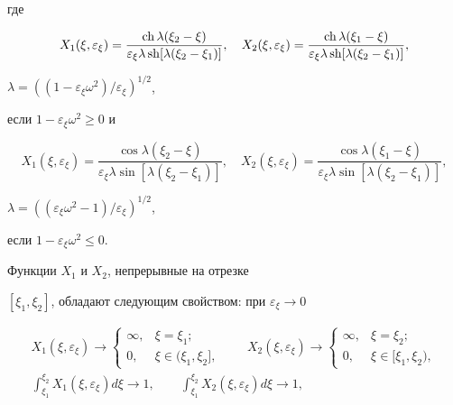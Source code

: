 где


$$


X_{1}(\xi,\varepsilon_{\xi})=\frac{\ch \lambda(\xi_{2}-\xi)}


{\varepsilon_{\xi}\lambda \sh[\lambda(\xi_{2}-\xi_{1})]},\quad


X_{2}(\xi,\varepsilon_{\xi})=\frac{\ch \lambda(\xi_{1}-\xi)}


{\varepsilon_{\xi}\lambda \sh[\lambda(\xi_{2}-\xi_{1})]},


$$


$\lambda=((1-\varepsilon_{\xi}\omega^{2})/\varepsilon_{\xi})^{1/2}$,


если $1-\varepsilon_{\xi}\omega^{2} \geq 0$ и


$$


X_{1}(\xi,\varepsilon_{\xi})=\frac{\cos \lambda(\xi_{2}-\xi)}


{\varepsilon_{\xi}\lambda \sin[\lambda(\xi_{2}-\xi_{1})]},\quad


X_{2}(\xi,\varepsilon_{\xi})=\frac{\cos \lambda(\xi_{1}-\xi)}


{\varepsilon_{\xi}\lambda \sin[\lambda(\xi_{2}-\xi_{1})]},


$$


$\lambda=((\varepsilon_{\xi}\omega^{2}-1)/\varepsilon_{\xi})^{1/2}$,


если $1-\varepsilon_{\xi}\omega^{2} \leq 0$.





\noindent{}Функции $X_{1}$ и $X_{2}$, непрерывные на отрезке


$[\xi_{1},\xi_{2}]$, обладают следующим свойством: при $ \varepsilon_{\xi}


\to 0 $


\begin{gather*}


X_{1}(\xi,\varepsilon_{\xi}) \to


\begin{cases}


\infty, & \xi=\xi_{1}; \\


0, & \xi \in (\xi_{1},\xi_{2}],


\end{cases}


\qquad


X_{2}(\xi,\varepsilon_{\xi}) \to


\begin{cases}


\infty, & \xi=\xi_{2}; \\


0, & \xi \in [\xi_{1}, \xi_{2}),


\end{cases}


\\


\int_{\xi_{1}}^{\xi_{2}} X_{1}(\xi,\varepsilon_{\xi}) d\xi \to 1, \qquad


\int_{\xi_{1}}^{\xi_{2}} X_{2}(\xi,\varepsilon_{\xi}) d\xi \to 1,


\end{gather*}



